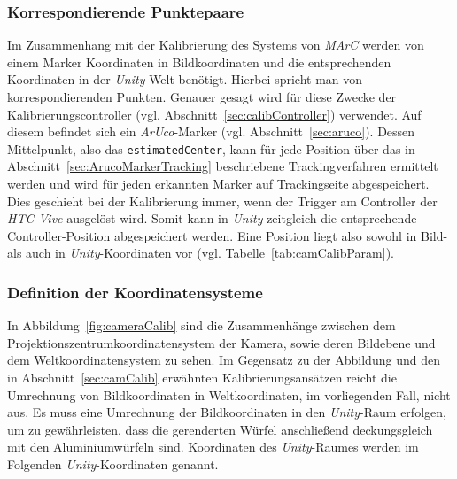 \subsubsection{Korrespondierende Punktepaare} \label{sec:Korrespondenz} 
Im Zusammenhang mit der Kalibrierung des Systems von \textit{MArC} werden von einem Marker Koordinaten in Bildkoordinaten und die entsprechenden Koordinaten in der \emph{Unity}-Welt benötigt. Hierbei spricht man von korrespondierenden Punkten. Genauer gesagt wird für diese Zwecke der Kalibrierungscontroller (vgl. Abschnitt~\ref{sec:calibController}) verwendet. Auf diesem befindet sich ein \textit{ArUco}-Marker (vgl. Abschnitt~\ref{sec:aruco}). Dessen Mittelpunkt, also das \texttt{estimated\-Center}, kann für jede Position über das in Abschnitt~\ref{sec:ArucoMarkerTracking} beschriebene Trackingverfahren ermittelt werden und wird für jeden erkannten Marker auf Trackingseite abgespeichert. Dies geschieht bei der Kalibrierung immer, wenn der Trigger am Controller der \textit{HTC Vive} ausgelöst wird. Somit kann in \textit{Unity} zeitgleich die entsprechende Controller-Position abgespeichert werden. Eine Position liegt also sowohl in Bild- als auch in \emph{Unity}-Koordinaten vor (vgl. Tabelle~\ref{tab:camCalibParam}).  

\subsubsection{Definition der Koordinatensysteme} \label{sec:DefKoords} 
In Abbildung~\ref{fig:cameraCalib} sind die Zusammenhänge zwischen dem Projektionszentrumkoordinatensystem der Kamera, sowie deren Bildebene und dem Weltkoordinatensystem zu sehen. Im Gegensatz zu der Abbildung und den in Abschnitt~\ref{sec:camCalib} erwähnten Kalibrierungsansätzen reicht die Umrechnung von Bildkoordinaten in Weltkoordinaten, im vorliegenden Fall, nicht aus. Es muss eine Umrechnung der Bildkoordinaten in den \textit{Unity}-Raum erfolgen, um zu gewährleisten, dass die gerenderten Würfel anschließend deckungsgleich mit den Aluminiumwürfeln sind. Koordinaten des \textit{Unity}-Raumes werden im Folgenden \emph{Unity}-Koordinaten genannt.\\

